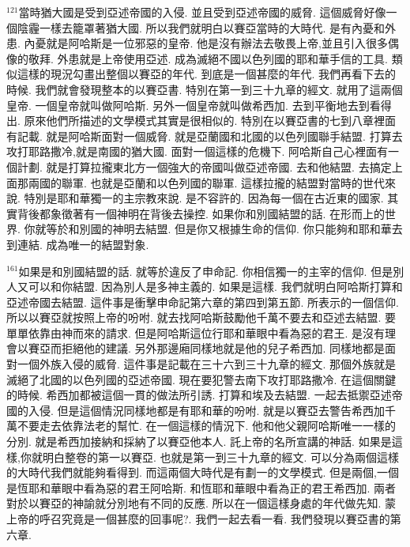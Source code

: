 \documentclass{book}
\begin{document}
$^{121}$當時猶大國是受到亞述帝國的入侵.
並且受到亞述帝國的威脅.
這個威脅好像一個陰霾一樣去籠罩著猶大國.
所以我們就明白以賽亞當時的大時代.
是有內憂和外患.
內憂就是阿哈斯是一位邪惡的皇帝.
他是沒有辦法去敬畏上帝,並且引入很多偶像的敬拜.
外患就是上帝使用亞述.
成為滅絕不國以色列國的耶和華手信的工具.
類似這樣的現況勾畫出整個以賽亞的年代.
到底是一個甚麼的年代.
我們再看下去的時候.
我們就會發現整本的以賽亞書.
特別在第一到三十九章的經文.
就用了這兩個皇帝.
一個皇帝就叫做阿哈斯.
另外一個皇帝就叫做希西加.
去到平衡地去到看得出.
原來他們所描述的文學模式其實是很相似的.
特別在以賽亞書的七到八章裡面有記載.
就是阿哈斯面對一個威脅.
就是亞蘭國和北國的以色列國聯手結盟.
打算去攻打耶路撒冷,就是南國的猶大國.
面對一個這樣的危機下.
阿哈斯自己心裡面有一個計劃.
就是打算拉攏東北方一個強大的帝國叫做亞述帝國.
去和他結盟.
去搞定上面那兩國的聯軍.
也就是亞蘭和以色列國的聯軍.
這樣拉攏的結盟對當時的世代來說.
特別是耶和華獨一的主宗教來說.
是不容許的.
因為每一個在古近東的國家.
其實背後都象徵著有一個神明在背後去操控.
如果你和別國結盟的話.
在形而上的世界.
你就等於和別國的神明去結盟.
但是你又根據生命的信仰.
你只能夠和耶和華去到連結.
成為唯一的結盟對象.

$^{161}$如果是和別國結盟的話.
就等於違反了申命記.
你相信獨一的主宰的信仰.
但是別人又可以和你結盟.
因為別人是多神主義的.
如果是這樣.
我們就明白阿哈斯打算和亞述帝國去結盟.
這件事是衝擊申命記第六章的第四到第五節.
所表示的一個信仰.
所以以賽亞就按照上帝的吩咐.
就去找阿哈斯鼓勵他千萬不要去和亞述去結盟.
要單單依靠由神而來的請求.
但是阿哈斯這位行耶和華眼中看為惡的君王.
是沒有理會以賽亞而拒絕他的建議.
另外那邊廂同樣地就是他的兒子希西加.
同樣地都是面對一個外族入侵的威脅.
這件事是記載在三十六到三十九章的經文.
那個外族就是滅絕了北國的以色列國的亞述帝國.
現在要犯警去南下攻打耶路撒冷.
在這個關鍵的時候.
希西加都被這個一貫的做法所引誘.
打算和埃及去結盟.
一起去抵禦亞述帝國的入侵.
但是這個情況同樣地都是有耶和華的吩咐.
就是以賽亞去警告希西加千萬不要走去依靠法老的幫忙.
在一個這樣的情況下.
他和他父親阿哈斯唯一一樣的分別.
就是希西加接納和採納了以賽亞他本人.
託上帝的名所宣講的神話.
如果是這樣,你就明白整卷的第一以賽亞.
也就是第一到三十九章的經文.
可以分為兩個這樣的大時代我們就能夠看得到.
而這兩個大時代是有劃一的文學模式.
但是兩個,一個是恆耶和華眼中看為惡的君王阿哈斯.
和恆耶和華眼中看為正的君王希西加.
兩者對於以賽亞的神諭就分別地有不同的反應.
所以在一個這樣身處的年代做先知.
蒙上帝的呼召究竟是一個甚麼的回事呢?.
我們一起去看一看.
我們發現以賽亞書的第六章.
\end{document}
